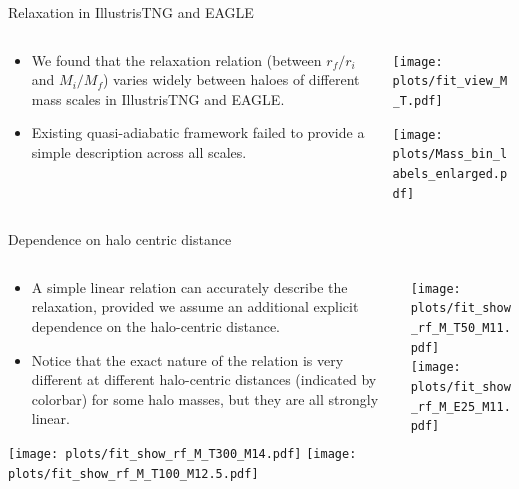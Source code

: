 \documentclass{beamer}
\begin{document}
\begin{frame}{Relaxation in IllustrisTNG and EAGLE}
    \begin{columns}
        \begin{column}{0.4\linewidth}
            \begin{itemize}
                \item We found that the relaxation relation (between $r_f/r_i$ and $M_i/M_f$) varies widely between haloes of different mass scales in IllustrisTNG and EAGLE.
                \item Existing quasi-adiabatic framework failed to provide a simple description across all scales.
            \end{itemize}
            
        \end{column}
        \begin{column}{0.59\linewidth}
            \begin{center}
                \texttt{[image: plots/fit\_view\_M\_T.pdf]}
            \end{center}
            \begin{center}
                \texttt{[image: plots/Mass\_bin\_labels\_enlarged.pdf]}
            \end{center}
        \end{column}
    \end{columns}
\end{frame}

\begin{frame}{Dependence on halo centric distance}
    \begin{columns}
        \begin{column}{0.63\linewidth}
            \begin{itemize}
                \item A simple linear relation can accurately describe the relaxation, provided we assume an additional explicit dependence on the halo-centric distance.
                \item Notice that the exact nature of the relation is very different at different halo-centric distances (indicated by colorbar) for some halo masses, but they are all strongly linear.
            \end{itemize}
            \texttt{[image: plots/fit\_show\_rf\_M\_T300\_M14.pdf]}
            \texttt{[image: plots/fit\_show\_rf\_M\_T100\_M12.5.pdf]}
        \end{column} %
        \begin{column}{0.36\linewidth}
            \begin{center}
                \texttt{[image: plots/fit\_show\_rf\_M\_T50\_M11.pdf]}\\
                \texttt{[image: plots/fit\_show\_rf\_M\_E25\_M11.pdf]}
            \end{center}
        \end{column}
    \end{columns}
\end{frame}
\end{document}
